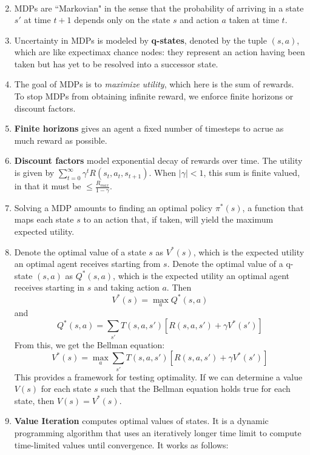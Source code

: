 \documentclass[10pt]{article}
\begin{document}
\begin{multicols}{2}
\begin{addmargin}[0.8em]{0.5em}
\begin{enumerate}[label=(\alph*)]
\begin{align*}
            \end{align*}
            \item MDPs are ``Markovian" in the sense that the probability of arriving in a state $s'$ at time $t + 1$ depends only on the state $s$ and action $a$ taken at time $t$.
            \item Uncertainty in MDPs is modeled by \textbf{q-states}, denoted by the tuple $(s,a)$, which are like expectimax chance nodes: they represent an action having been taken but has yet to be resolved into a successor state.
            \item The goal of MDPs is to \textit{maximize utility}, which here is the sum of rewards. To stop MDPs from obtaining infinite reward, we enforce finite horizons or discount factors. 
            \item \textbf{Finite horizons} gives an agent a fixed number of timesteps to acrue as much reward as possible. 
            \item \textbf{Discount factors} model exponential decay of rewards over time. The utility is given by $\sum_{t=0}^{\infty} \gamma^t R(s_t,a_t,s_{t+1})$. When $|\gamma| < 1$, this sum is finite valued, in that it must be $ \leq \frac{R_{max}}{1-\gamma}$.
            \item Solving a MDP amounts to finding an optimal policy $\pi^*(s)$, a function that maps each state $s$ to an action that, if taken, will yield the maximum expected utility.
            \item Denote the optimal value of a state $s$ as $V^*(s)$, which is the expected utility an optimal agent receives starting from $s$. Denote the optimal value of a q-state $(s,a)$ as $Q^*(s,a)$, which is the expected utility an optimal agent receives starting in $s$ and taking action $a$. Then
            $$V^*(s)=\max_{a}Q^*(s,a)$$ and $$Q^*(s,a)=\sum_{s'} T(s,a,s') [R(s,a,s')+\gamma V^*(s')]$$
            From this, we get the Bellman equation:
            $$V^*(s)=\max_{a}\sum_{s'} T(s,a,s') [R(s,a,s')+\gamma V^*(s')]$$
            This provides a framework for testing optimality. If we can determine a value $V(s)$ for each state $s$ such that the Bellman equation holds true for each state, then $V(s)=V^*(s)$.
            \item \textbf{Value Iteration} computes optimal values of states. It is a dynamic programming algorithm that uses an iteratively longer time limit to compute time-limited values until convergence. It works as follows:
            \begin{enumerate}[label=\roman*.]

\end{enumerate}
\end{enumerate}
\end{addmargin}
\end{multicols}
\end{document}
